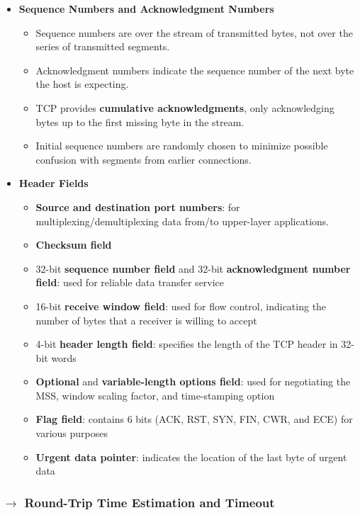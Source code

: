 \begin{itemize}
    \item \textbf{Sequence Numbers and Acknowledgment Numbers}
    \begin{itemize}
        \item Sequence numbers are over the stream of transmitted bytes, not over the series of transmitted segments.
        \item Acknowledgment numbers indicate the sequence number of the next byte the host is expecting.
        \item TCP provides \textbf{cumulative acknowledgments}, only acknowledging bytes up to the first missing byte in the stream.
        \item Initial sequence numbers are randomly chosen to minimize possible confusion with segments from earlier connections.
    \end{itemize}
    
    \item \textbf{Header Fields}
    \begin{itemize}
        \item \textbf{Source and destination port numbers}: for multiplexing/demultiplexing data from/to upper-layer applications.
        \item \textbf{Checksum field}
        \item 32-bit \textbf{sequence number field} and 32-bit \textbf{acknowledgment number field}: used for reliable data transfer service
        \item 16-bit \textbf{receive window field}: used for flow control, indicating the number of bytes that a receiver is willing to accept
        \item 4-bit \textbf{header length field}: specifies the length of the TCP header in 32-bit words
        \item \textbf{Optional} and \textbf{variable-length options field}: used for negotiating the MSS, window scaling factor, and time-stamping option
        \item \textbf{Flag field}: contains 6 bits (ACK, RST, SYN, FIN, CWR, and ECE) for various purposes
        \item \textbf{Urgent data pointer}: indicates the location of the last byte of urgent data
    \end{itemize}
\end{itemize}

\subsubsection[3.5.3 Round-Trip Time Estimation and Timeout]{$\pmb{\rightarrow}$ Round-Trip Time Estimation and Timeout}

